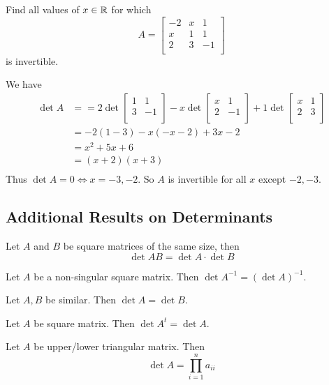 \documentclass{article}
\begin{document}
\begin{example}
  Find all values of $x \in \mathbb{R}$ for which \[
    A =
    \begin{bmatrix}
      -2 & x & 1  \\
      x  & 1 & 1  \\
      2  & 3 & -1 \\
    \end{bmatrix}
  \] is invertible.

  We have
  \begin{align*}
    \det A & = =2\det
    \begin{bmatrix}
      1 & 1  \\
      3 & -1 \\
    \end{bmatrix} - x\det
    \begin{bmatrix}
      x & 1  \\
      2 & -1 \\
    \end{bmatrix} + 1\det
    \begin{bmatrix}
      x & 1 \\
      2 & 3 \\
    \end{bmatrix}                          \\
           & = -2(1-3) - x(-x - 2) + 3x - 2 \\
           & = x^2 + 5x + 6                 \\
           & = (x+2)(x+3)                   \\
  \end{align*}
  Thus $\det A = 0 \iff x = -3, -2$. So $A$ is invertible for all $x$ except $-2, -3$.
\end{example}
\subsection{Additional Results on Determinants}
\begin{theorem}
  Let $A$ and $B$ be square matrices of the same size, then \[
    \det AB = \det A \cdot \det B
  \]
\end{theorem}
\begin{theorem}
  Let $A$ be a non-singular square matrix. Then $\det A^{-1} = (\det A)^{-1}$.
\end{theorem}
\begin{theorem}
  Let $A, B$ be similar. Then $\det A = \det B$.
\end{theorem}
\begin{theorem}
  Let $A$ be square matrix. Then $\det A^t = \det A$.
\end{theorem}
\begin{theorem}
  Let $A$ be upper/lower triangular matrix. Then \[
    \det A = \prod_{i=1}^n a_{ii}
  \]
\end{theorem}
\end{document}
